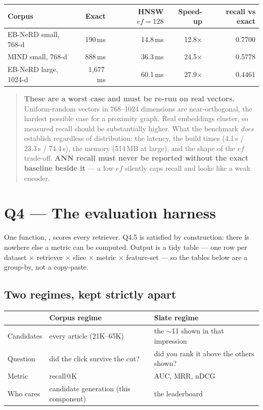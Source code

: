 \documentclass[11pt,a4paper]{article}
\newcommand{\brk}[1]{%
  \begingroup\ttfamily\hyphenchar\font=-1
  \discretionary{}{}{}%
  \expandafter\brkscan\detokenize{#1}\relax\endgroup}
\def\brkscan#1{%
  \ifx#1\relax\else
    \char`#1%
    \ifnum`#1=`/ \penalty0 \fi
    \ifnum`#1=`_ \penalty0 \fi
    \ifnum`#1=`. \penalty0 \fi
    \expandafter\brkscan
  \fi}
\begin{document}
\begin{center}
\begin{tabular}{lrrrr}
\toprule
Corpus & Exact & HNSW $ef{=}128$ & Speed-up & recall vs exact \\
\midrule
EB-NeRD small, 768-d  & 190\,ms   & 14.8\,ms & 12.8$\times$ & 0.7700 \\
MIND small, 768-d     & 888\,ms   & 36.3\,ms & 24.5$\times$ & 0.5778 \\
EB-NeRD large, 1024-d & 1{,}677\,ms & 60.1\,ms & 27.9$\times$ & 0.4461 \\
\bottomrule
\end{tabular}
\end{center}

\begin{quote}\small
\textbf{These are a worst case and must be re-run on real vectors.} Uniform-random vectors in
768--1024 dimensions are near-orthogonal, the hardest possible case for a proximity graph. Real
embeddings cluster, so measured recall should be substantially higher. What the benchmark
\emph{does} establish regardless of distribution: the latency, the build times (4.1\,s / 23.3\,s /
74.4\,s), the memory (514\,MB at large), and the shape of the $ef$ trade-off. \textbf{ANN recall
must never be reported without the exact baseline beside it} --- a low $ef$ silently caps recall
and looks like a weak encoder.
\end{quote}

\section{Q4 --- The evaluation harness}

One function, \brk{evaluate(retriever, split, ...)}, scores every retriever. Q4.5 is satisfied by
construction: there is nowhere else a metric can be computed. Output is a tidy table --- one row
per dataset $\times$ retriever $\times$ slice $\times$ metric $\times$ feature-set --- so the
tables below are a group-by, not a copy-paste.

\subsection{Two regimes, kept strictly apart}

\begin{center}
\begin{tabular}{lll}
\toprule
 & \textbf{Corpus regime} & \textbf{Slate regime} \\
\midrule
Candidates & every article (21K--65K) & the $\sim$11 shown in that impression \\
Question & did the click survive the cut? & did you rank it above the others shown? \\
Metric & recall@K & AUC, MRR, nDCG \\
Who cares & candidate generation (this component) & the leaderboard \\
\bottomrule
\end{tabular}
\end{center}
\end{document}
